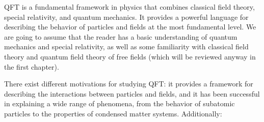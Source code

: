 
QFT is a fundamental framework in physics that combines classical field theory, special relativity, and quantum mechanics. It provides a powerful language for describing the behavior of particles and fields at the most fundamental level. We are going to assume that the reader has a basic understanding of quantum mechanics and special relativity, as well as some familiarity with classical field theory and quantum field theory of free fields (which will be reviewed anyway in the first chapter).

There exist different motivations for studying QFT: it provides a framework for describing the interactions between particles and fields, and it has been successful in explaining a wide range of phenomena, from the behavior of subatomic particles to the properties of condensed matter systems. Additionally:
